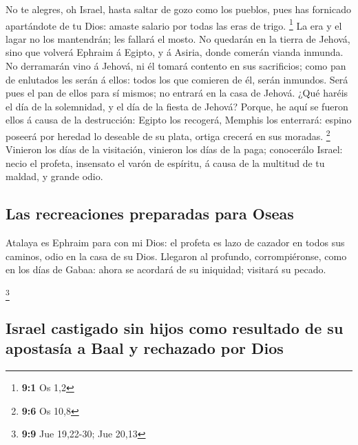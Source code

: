  No te alegres, oh Israel, hasta saltar de gozo como los
pueblos, pues has fornicado apartándote de tu Dios: amaste salario por
todas las eras de trigo. \footnote{\textbf{9:1} Os 1,2}  La
era y el lagar no los mantendrán; les fallará el mosto.  No
quedarán en la tierra de Jehová, sino que volverá Ephraim á Egipto, y á
Asiria, donde comerán vianda inmunda.  No derramarán vino á
Jehová, ni él tomará contento en sus sacrificios; como pan de enlutados
les serán á ellos: todos los que comieren de él, serán inmundos. Será
pues el pan de ellos para sí mismos; no entrará en la casa de Jehová.
 ¿Qué haréis el día de la solemnidad, y el día de la fiesta
de Jehová?  Porque, he aquí se fueron ellos á causa de la
destrucción: Egipto los recogerá, Memphis los enterrará: espino poseerá
por heredad lo deseable de su plata, ortiga crecerá en sus moradas.
\footnote{\textbf{9:6} Os 10,8}  Vinieron los días de la
visitación, vinieron los días de la paga; conocerálo Israel: necio el
profeta, insensato el varón de espíritu, á causa de la multitud de tu
maldad, y grande odio.

\hypertarget{las-recreaciones-preparadas-para-oseas}{%
\subsection{Las recreaciones preparadas para
Oseas}\label{las-recreaciones-preparadas-para-oseas}}

 Atalaya es Ephraim para con mi Dios: el profeta es lazo de
cazador en todos sus caminos, odio en la casa de su Dios. 
Llegaron al profundo, corrompiéronse, como en los días de Gabaa: ahora
se acordará de su iniquidad; visitará su pecado.

\footnote{\textbf{9:9} Jue 19,22-30; Jue 20,13}

\hypertarget{israel-castigado-sin-hijos-como-resultado-de-su-apostasuxeda-a-baal-y-rechazado-por-dios}{%
\subsection{Israel castigado sin hijos como resultado de su apostasía a
Baal y rechazado por
Dios}\label{israel-castigado-sin-hijos-como-resultado-de-su-apostasuxeda-a-baal-y-rechazado-por-dios}}

